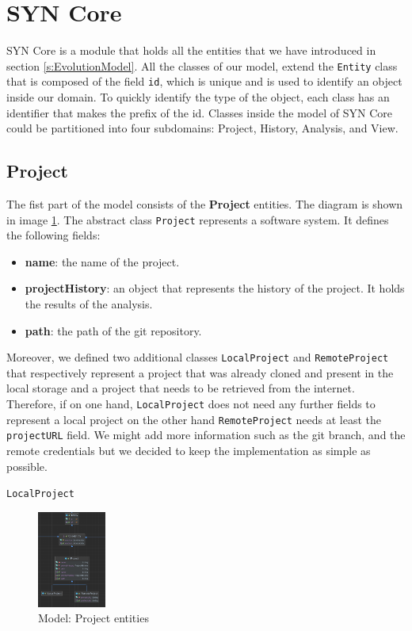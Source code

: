 \section{SYN Core}
SYN Core is a module that holds all the entities that we have introduced in section \ref{s:EvolutionModel}. 
All the classes of our model, extend the \texttt{Entity} class that is composed of the field \texttt{id}, which is unique and is used to identify an object inside our domain. 
To quickly identify the type of the object, each class has an identifier that makes the prefix of the id. 
Classes inside the model of SYN Core could be partitioned into four subdomains: Project, History, Analysis, and View. 

\subsection*{Project}
The fist part of the model consists of the \textbf{Project} entities. 
The diagram is shown in image \ref{fig:modelProject}. The abstract class \texttt{Project} represents a software system. It defines the following fields:
\begin{itemize}
    \item \textbf{name}: the name of the project.
    \item \textbf{projectHistory}: an object that represents the history of the project. It holds the results of the analysis. 
    \item \textbf{path}: the path of the git repository. 
\end{itemize}

Moreover, we defined two additional classes \texttt{LocalProject} and \texttt{RemoteProject} that respectively represent a project that was already cloned and present in the local storage and a project that needs to be retrieved from the internet. 
Therefore, if on one hand, \texttt{LocalProject} does not need any further fields to represent a local project on the other hand \texttt{RemoteProject} needs at least the \texttt{projectURL} field. We might add more information such as the git branch, and the remote credentials but we decided to keep the implementation as simple as possible. 

\texttt{LocalProject}

\begin{figure}
    \center
    \includegraphics[width=0.2\textwidth]{UMLProject.png}
    \caption{Model: Project entities}
    \label{fig:modelProject}
\end{figure}

